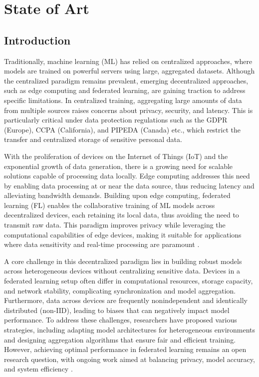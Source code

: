 \chapter{State of Art}
\label{chap:Chapter 2 title}
\section*{Introduction}

Traditionally, machine learning (ML) has relied on centralized approaches, where models are trained on powerful servers using large, aggregated datasets. Although the centralized paradigm remains prevalent, emerging decentralized approaches, such as edge computing and federated learning, are gaining traction to address specific limitations. In centralized training, aggregating large amounts of data from multiple sources raises concerns about privacy, security, and latency. This is particularly critical under data protection regulations such as the GDPR (Europe), CCPA (California), and PIPEDA (Canada) etc., which restrict the transfer and centralized storage of sensitive personal data.

With the proliferation of devices on the Internet of Things (IoT) and the exponential growth of data generation, there is a growing need for scalable solutions capable of processing data locally. Edge computing addresses this need by enabling data processing at or near the data source, thus reducing latency and alleviating bandwidth demands. Building upon edge computing, federated learning (FL) enables the collaborative training of ML models across decentralized devices, each retaining its local data, thus avoiding the need to transmit raw data. This paradigm improves privacy while leveraging the computational capabilities of edge devices, making it suitable for applications where data sensitivity and real-time processing are paramount \cite{ref1}.

A core challenge in this decentralized paradigm lies in building robust models across heterogeneous devices without centralizing sensitive data. Devices in a federated learning setup often differ in computational resources, storage capacity, and network stability, complicating synchronization and model aggregation. Furthermore, data across devices are frequently nonindependent and identically distributed (non-IID), leading to biases that can negatively impact model performance. To address these challenges, researchers have proposed various strategies, including adapting model architectures for heterogeneous environments and designing aggregation algorithms that ensure fair and efficient training. However, achieving optimal performance in federated learning remains an open research question, with ongoing work aimed at balancing privacy, model accuracy, and system efficiency \cite{ref2}.


